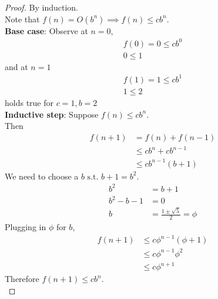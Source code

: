 \documentclass{article}
\begin{document}
\begin{proof}
    By induction. \\
    Note that \(f(n) = O(b^n) \implies f(n) \leq cb^n\). \\
    \textbf{Base case}: Observe at \(n = 0\),
    \begin{align*}
        f(0) = 0 \leq cb^0 \\
        0 \leq 1
    \end{align*}
    and at \(n = 1\)
    \begin{align*}
        f(1) = 1 \leq cb^1 \\
        1 \leq 2
    \end{align*}
    holds true for \(c = 1, b = 2\) \\
    \textbf{Inductive step}: Suppose \(f(n) \leq cb^n\). \\
    Then \begin{align*}
        f(n+1) & = f(n) + f(n-1)      \\
               & \leq cb^n + cb^{n-1} \\
               & \leq cb^{n-1}(b+1)
    \end{align*}
    We need to choose a \(b \text{ s.t. } b + 1 = b^2\).
    \begin{align*}
        b^2         & = b + 1                           \\
        b^2 - b - 1 & = 0                               \\
        b           & = \frac{1 \pm \sqrt{5}}{2} = \phi
    \end{align*}
    Plugging in \(\phi\) for \(b\),
    \begin{align*}
        f(n+1) & \leq c\phi^{n-1}(\phi+1) \\
               & \leq c\phi^{n-1}\phi^2   \\
               & \leq c\phi^{n+1}
    \end{align*}
    Therefore \(f(n+1) \leq cb^n\). \\
\end{proof}


\end{document}
